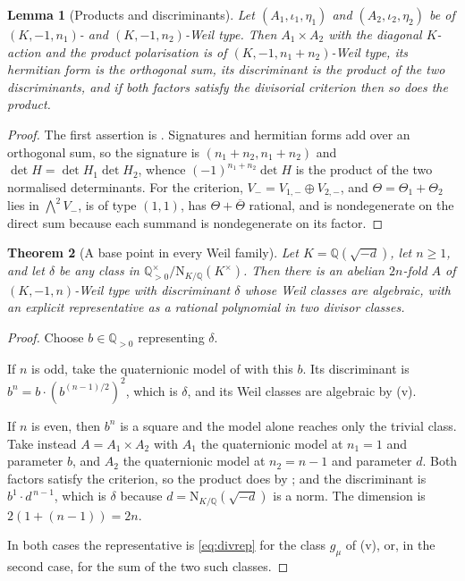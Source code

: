 \documentclass[11pt,reqno]{amsart}
\theoremstyle{plain}
\newtheorem{theorem}{Theorem}[section]
\newtheorem{lemma}[theorem]{Lemma}
\theoremstyle{definition}
\theoremstyle{remark}
\newcommand{\QQ}{\mathbb{Q}}
\newcommand{\Nm}{\mathrm{N}}             %
\newcommand{\bbar}[1]{\overline{#1}}
\begin{document}
\begin{lemma}[Products and discriminants]\label{lem:products}
Let $(A_{1},\iota_{1},\eta_{1})$ and $(A_{2},\iota_{2},\eta_{2})$ be of
$(K,-1,n_{1})$- and $(K,-1,n_{2})$-Weil type. Then
$A_{1}\times A_{2}$ with the diagonal $K$-action and the product polarisation
is of $(K,-1,n_{1}+n_{2})$-Weil type, its hermitian form is the orthogonal
sum, its discriminant is the product of the two discriminants, and if both
factors satisfy the divisorial criterion then so does the product.
\end{lemma}

\begin{proof}
The first assertion is . Signatures and hermitian forms add
over an orthogonal sum, so the signature is
$(n_{1}+n_{2},n_{1}+n_{2})$ and $\det H=\det H_{1}\det H_{2}$, whence
$(-1)^{n_{1}+n_{2}}\det H$ is the product of the two normalised determinants.
For the criterion, $V_{-}=V_{1,-}\oplus V_{2,-}$, and
$\Theta=\Theta_{1}+\Theta_{2}$ lies in $\bigwedge^{2}V_{-}$, is of type
$(1,1)$, has $\Theta+\bbar{\Theta}$ rational, and is nondegenerate on the
direct sum because each summand is nondegenerate on its factor.
\end{proof}

\begin{theorem}[A base point in every Weil family]\label{thm:everyfamily}
Let $K=\QQ(\sqrt{-d})$, let $n\ge1$, and let $\delta$ be any class in
$\QQ^{\times}_{>0}/\Nm_{K/\QQ}(K^{\times})$. Then there is an abelian
$2n$-fold $A$ of $(K,-1,n)$-Weil type with discriminant $\delta$ whose Weil
classes are algebraic, with an explicit representative as a rational
polynomial in two divisor classes.
\end{theorem}

\begin{proof}
Choose $b\in\QQ_{>0}$ representing $\delta$.

If $n$ is odd, take the quaternionic model of  with this $b$.
Its discriminant is $b^{n}=b\cdot(b^{(n-1)/2})^{2}$, which is $\delta$, and
its Weil classes are algebraic by (v).

If $n$ is even, then $b^{n}$ is a square and the model alone reaches only the
trivial class. Take instead $A=A_{1}\times A_{2}$ with $A_{1}$ the
quaternionic model at $n_{1}=1$ and parameter $b$, and $A_{2}$ the
quaternionic model at $n_{2}=n-1$ and parameter $d$. Both factors satisfy the
criterion, so the product does by ; and the discriminant is
$b^{1}\cdot d^{\,n-1}$, which is $\delta$ because $d=\Nm_{K/\QQ}(\sqrt{-d})$ is
a norm. The dimension is $2(1+(n-1))=2n$.

In both cases the representative is \eqref{eq:divrep} for the class
$g_{\mu}$ of (v), or, in the second case, for the sum of
the two such classes.
\end{proof}
\end{document}
